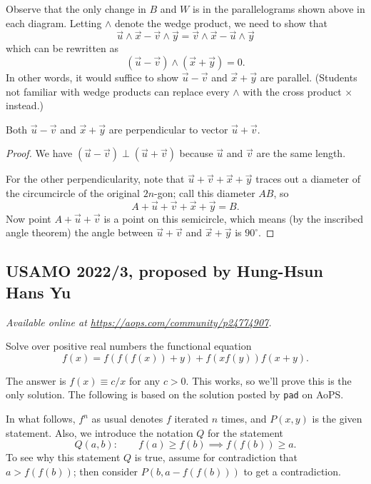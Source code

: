 \documentclass[11pt]{scrartcl}
\begin{document}
Observe that the only change in $B$ and $W$
is in the parallelograms shown above in each diagram.
Letting $\wedge$ denote the wedge product,
we need to show that
\[ \vec u \wedge \vec x - \vec v \wedge \vec y
  = \vec v \wedge \vec x - \vec u \wedge \vec y \]
which can be rewritten as
\[ (\vec u - \vec v) \wedge (\vec x + \vec y) = 0. \]
In other words, it would suffice to show
$\vec u - \vec v$ and $\vec x + \vec y$ are parallel.
(Students not familiar with wedge products can replace
every $\wedge$ with the cross product $\times$ instead.)
\begin{claim*}
  Both $\vec u - \vec v$ and $\vec x + \vec y$
  are perpendicular to vector $\vec u + \vec v$.
\end{claim*}
\begin{proof}
  We have $(\vec u - \vec v) \perp (\vec u + \vec v)$
  because $\vec u$ and $\vec v$ are the same length.

  For the other perpendicularity, note that
  $\vec u + \vec v + \vec x + \vec y$
  traces out a diameter of the circumcircle of the original $2n$-gon;
  call this diameter $AB$, so
  \[ A + \vec u + \vec v + \vec x + \vec y = B. \]
  Now point $A + \vec u + \vec v$ is a point on this semicircle,
  which means (by the inscribed angle theorem)
  the angle between $\vec u + \vec v$ and $\vec x + \vec y$ is $90^\circ$.
\end{proof}
\pagebreak

\subsection{USAMO 2022/3, proposed by Hung-Hsun Hans Yu}
\textsl{Available online at \url{https://aops.com/community/p24774907}.}
\begin{mdframed}[style=mdpurplebox,frametitle={Problem statement}]
Solve over positive real numbers the functional equation
\[ f(x) = f(f(f(x)) + y) + f(xf(y)) f(x+y). \]
\end{mdframed}
The answer is $f(x) \equiv c/x$ for any $c > 0$.
This works, so we'll prove this is the only solution.
The following is based on the solution posted by \texttt{pad} on AoPS.

In what follows, $f^n$ as usual denotes $f$ iterated $n$ times,
and $P(x,y)$ is the given statement.
Also, we introduce the notation $Q$ for the statement
\[ Q(a,b) : \qquad f(a) \ge f(b) \implies f(f(b)) \ge a. \]
To see why this statement $Q$ is true,
assume for contradiction that $a > f(f(b))$;
then consider $P(b, a-f(f(b)))$ to get a contradiction.
\end{document}
